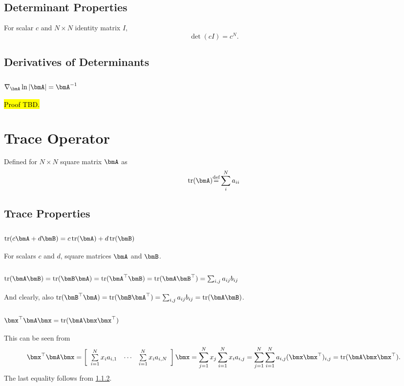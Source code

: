 \documentclass[11pt]{article}
\newcommand{\NotDone}[1]{%
	\sethlcolor{blue}\hl{#1}\sethlcolor{yellow}}
\def\Def{{\stackrel{\text{def}}{=}}}
\DeclareMathOperator{\Trace}{tr}
\begin{document}
\subsection{Determinant Properties}
For scalar $c$ and $N\times N$ identity matrix $I$,
\[ \det(cI) = c^N. \]

\subsection{Derivatives of Determinants}

\subsubsection{$\nabla_{\bmA} \ln |\bmA| = \bmA^{-1}$}
\NotDone{Proof TBD.}






\section{Trace Operator}
Defined for $N \times N$ square matrix $\bmA$ as
\begin{equation}
\Trace(\bmA) \Def \sum_{i}^{N} a_{ii}
\label{eq:Definition-Trace}
\end{equation}

\subsection{Trace Properties}

\subsubsection{$\Trace(c\bmA + d\bmB) = c\Trace(\bmA) + d\Trace(\bmB)$}
For scalars $c$ and $d$, square matrices $\bmA$ and $\bmB$.

\subsubsection{$\Trace(\bmA\bmB) = \Trace(\bmB\bmA) = \Trace(\bmA^\top\bmB) = \Trace(\bmA\bmB^\top) = \sum_{i,j} a_{ij}b_{ij}$}
\label{sec:trace-communitivity}
And clearly, also $\Trace(\bmB^\top\bmA) = \Trace(\bmB\bmA^\top) = \sum_{i,j} a_{ij}b_{ij} = \Trace(\bmA\bmB)$.

\subsubsection{$\bmx^\top \bmA \bmx = \Trace(\bmA \bmx \bmx^\top)$}
This can be seen from
\[\bmx^\top \bmA \bmx = \left[\begin{array}{ccc}
\sum\limits_{i=1}^N x_i a_{i, 1} & \cdots & \sum\limits_{i=1}^N x_i a_{i, N}
\end{array}\right] \bmx = \sum_{j=1}^{N} x_j \sum_{i=1}^N x_i a_{i, j} = \sum_{j=1}^{N} \sum_{i=1}^N a_{i, j} (\bmx \bmx^\top)_{i,j} = \Trace(\bmA \bmx \bmx^\top). \]
The last equality follows from \cref{sec:trace-communitivity}. %
\end{document}
